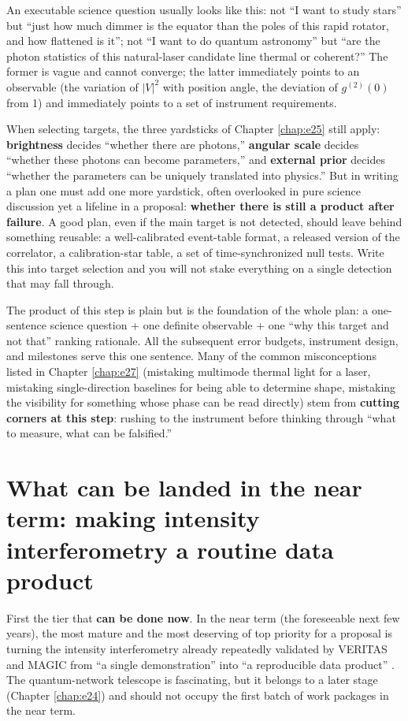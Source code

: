 An executable science question usually looks like this: not ``I want to study stars'' but ``just how much dimmer is the equator than the poles of this rapid rotator, and how flattened is it''; not ``I want to do quantum astronomy'' but ``are the photon statistics of this natural-laser candidate line thermal or coherent?'' The former is vague and cannot converge; the latter immediately points to an observable (the variation of \(|V|^2\) with position angle, the deviation of \(g^{(2)}(0)\) from 1) and immediately points to a set of instrument requirements.

When selecting targets, the three yardsticks of Chapter \ref{chap:e25} still apply: \textbf{brightness} decides ``whether there are photons,'' \textbf{angular scale} decides ``whether these photons can become parameters,'' and \textbf{external prior} decides ``whether the parameters can be uniquely translated into physics.'' But in writing a plan one must add one more yardstick, often overlooked in pure science discussion yet a lifeline in a proposal: \textbf{whether there is still a product after failure}. A good plan, even if the main target is not detected, should leave behind something reusable: a well-calibrated event-table format, a released version of the correlator, a calibration-star table, a set of time-synchronized null tests. Write this into target selection and you will not stake everything on a single detection that may fall through.

The product of this step is plain but is the foundation of the whole plan: a one-sentence science question + one definite observable + one ``why this target and not that'' ranking rationale. All the subsequent error budgets, instrument design, and milestones serve this one sentence. Many of the common misconceptions listed in Chapter \ref{chap:e27} (mistaking multimode thermal light for a laser, mistaking single-direction baselines for being able to determine shape, mistaking the visibility for something whose phase can be read directly) stem from \textbf{cutting corners at this step}: rushing to the instrument before thinking through ``what to measure, what can be falsified.''

\section{What can be landed in the near term: making intensity interferometry a routine data product}
\label{sec:e28-nearterm}

First the tier that \textbf{can be done now}. In the near term (the foreseeable next few years), the most mature and the most deserving of top priority for a proposal is turning the intensity interferometry already repeatedly validated by VERITAS and MAGIC from ``a single demonstration'' into ``a reproducible data product'' \citep{2020NatAs...4.1164A,2024MNRAS.529.4387A}. The quantum-network telescope is fascinating, but it belongs to a later stage (Chapter \ref{chap:e24}) and should not occupy the first batch of work packages in the near term.

